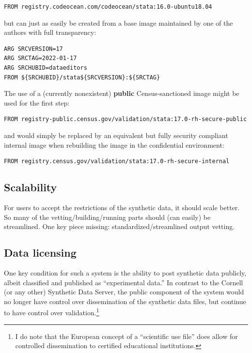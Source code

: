 \documentclass[inline]{hdsr}
\begin{document}
\begin{lstlisting}[language=docker]
FROM registry.codeocean.com/codeocean/stata:16.0-ubuntu18.04
\end{lstlisting}

\noindent but can just as easily be created from a base image maintained by one of the authors with full transparency:

\begin{lstlisting}[language=docker]
ARG SRCVERSION=17
ARG SRCTAG=2022-01-17
ARG SRCHUBID=dataeditors
FROM ${SRCHUBID}/stata${SRCVERSION}:${SRCTAG}
\end{lstlisting}

\noindent The use of a  (currently nonexistent) \textbf{public}  Census-sanctioned image might be used for the first step:

\begin{lstlisting}[language=docker]
FROM registry-public.census.gov/validation/stata:17.0-rh-secure-public
\end{lstlisting}

\noindent and would simply be replaced by an equivalent but fully security compliant internal image when rebuilding the image in the confidential environment:

\begin{lstlisting}[language=docker]
FROM registry.census.gov/validation/stata:17.0-rh-secure-internal
\end{lstlisting}



\subsection{Scalability}

For users to accept the restrictions of the synthetic data, it should scale better. So many of the vetting/building/running parts should (can easily) be streamlined. One key piece missing: standardized/streamlined output vetting.

\subsection{Data licensing}

One key condition for such a system is the ability to post synthetic data publicly, albeit  classified and published as ``experimental data.'' In contrast to the Cornell (or any other) Synthetic Data Server, the public component of the system would no longer have control over dissemination of the synthetic data files, but continue to have control over validation.\footnote{I do note that the European concept of a ``scientific use file'' does allow for controlled dissemination to certified educational institutions.}
\end{document}
